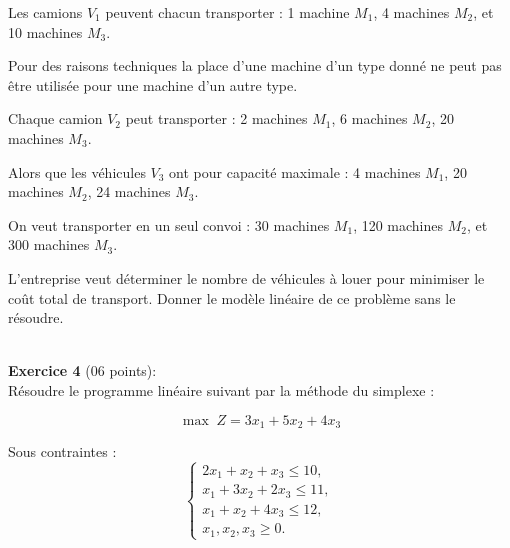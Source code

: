 Les camions $V_1$ peuvent chacun transporter :  
1 machine $M_1$, 4 machines $M_2$, et 10 machines $M_3$.

Pour des raisons techniques la place d’une machine d’un type donné ne peut pas être utilisée pour une machine d’un autre type.

Chaque camion $V_2$ peut transporter :  
2 machines $M_1$, 6 machines $M_2$, 20 machines $M_3$.

Alors que les véhicules $V_3$ ont pour capacité maximale :  
4 machines $M_1$, 20 machines $M_2$, 24 machines $M_3$.

On veut transporter en un seul convoi :  
30 machines $M_1$, 120 machines $M_2$, et 300 machines $M_3$.

L’entreprise veut déterminer le nombre de véhicules à louer pour minimiser le coût total de transport.  
Donner le modèle linéaire de ce problème sans le résoudre.

\qquad\\
\textbf{Exercice 4} (06 points):\\

Résoudre le programme linéaire suivant par la méthode du simplexe :

\[
\max\; Z = 3x_1 + 5x_2 + 4x_3
\]

Sous contraintes :
\[
\begin{cases}
2x_1 + x_2 + x_3 \le 10, \\
x_1 + 3x_2 + 2x_3 \le 11, \\
x_1 + x_2 + 4x_3 \le 12, \\
x_1, x_2, x_3 \ge 0.
\end{cases}
\]
